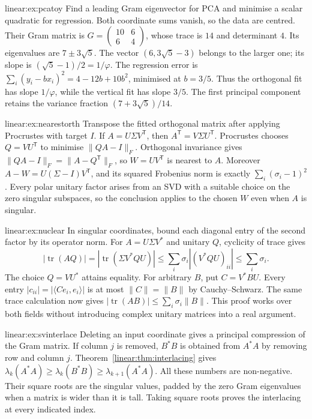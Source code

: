 \begin{solution}{linear:ex:pcatoy}
\idea Find a leading Gram eigenvector for PCA and minimise a scalar quadratic for regression.
\writeup Both coordinate sums vanish, so the data are centred. Their Gram matrix is $G=\begin{pmatrix}10&6\\6&4\end{pmatrix}$, whose trace is $14$ and determinant $4$. Its eigenvalues are $7\pm3\sqrt5$. The vector $(6,3\sqrt5-3)$ belongs to the larger one; its slope is $(\sqrt5-1)/2=1/\varphi$.
The regression error is $\sum_i(y_i-bx_i)^2=4-12b+10b^2$, minimised at $b=3/5$. Thus the orthogonal fit has slope $1/\varphi$, while the vertical fit has slope $3/5$. The first principal component retains the variance fraction $(7+3\sqrt5)/14$.
\end{solution}

\begin{solution}{linear:ex:nearestorth}
\idea Transpose the fitted orthogonal matrix after applying Procrustes with target $I$.
\writeup If $A=U\Sigma V^{\mathsf T}$, then $A^{\mathsf T}=V\Sigma U^{\mathsf T}$. Procrustes chooses $Q=VU^{\mathsf T}$ to minimise $\|QA-I\|_F$. Orthogonal invariance gives $\|QA-I\|_F=\|A-Q^{\mathsf T}\|_F$, so $W=UV^{\mathsf T}$ is nearest to $A$. Moreover $A-W=U(\Sigma-I)V^{\mathsf T}$, and its squared Frobenius norm is exactly $\sum_i(\sigma_i-1)^2$. Every polar unitary factor arises from an SVD with a suitable choice on the zero singular subspaces, so the conclusion applies to the chosen $W$ even when $A$ is singular.
\end{solution}

\begin{solution}{linear:ex:nuclear}
\idea In singular coordinates, bound each diagonal entry of the second factor by its operator norm.
\writeup For $A=U\Sigma V^*$ and unitary $Q$, cyclicity of trace gives
\[
|\operatorname{tr}(AQ)|=|\operatorname{tr}(\Sigma V^*QU)|
\le\sum_i\sigma_i |(V^*QU)_{ii}|\le\sum_i\sigma_i.
\]
The choice $Q=VU^*$ attains equality. For arbitrary $B$, put $C=V^*BU$. Every entry $|c_{ii}|=|\langle Ce_i,e_i\rangle|$ is at most $\|C\|=\|B\|$ by Cauchy--Schwarz. The same trace calculation now gives $|\operatorname{tr}(AB)|\le\sum_i\sigma_i\|B\|$. This proof works over both fields without introducing complex unitary matrices into a real argument.
\end{solution}

\begin{solution}{linear:ex:svinterlace}
\idea Deleting an input coordinate gives a principal compression of the Gram matrix.
\writeup If column $j$ is removed, $B^*B$ is obtained from $A^*A$ by removing row and column $j$. Theorem~\ref{linear:thm:interlacing} gives
$\lambda_k(A^*A)\ge\lambda_k(B^*B)\ge\lambda_{k+1}(A^*A)$.
All these numbers are non-negative. Their square roots are the singular values, padded by the zero Gram eigenvalues when a matrix is wider than it is tall. Taking square roots proves the interlacing at every indicated index.
\end{solution}

